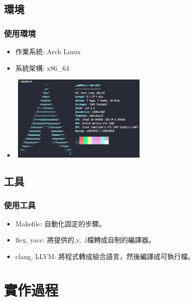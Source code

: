 \documentclass{beamer}
\begin{document}
\subsection{環境}
\begin{frame}
  \frametitle{使用環境}
  \begin{itemize}
    \item 作業系統: Arch Linux %
    \item 系統架構: x86\_64
    \item 
\includegraphics[width=260,height=160]{images/OS_INFO.png}
  \end{itemize}
\end{frame}

\subsection{工具}
\begin{frame}
  \frametitle{使用工具}
  \begin{itemize}
    \item Makefile: 自動化固定的步驟。
    \item flex, yacc: 將提供的.y, .l檔轉成自制的編譯器。
    \item clang, LLVM: 將程式轉成組合語言，然後編譯成可執行檔。
  \end{itemize}
\end{frame}

\section{實作過程}
\end{document}
